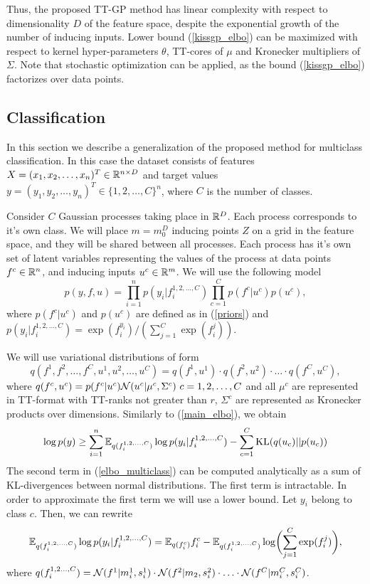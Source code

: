   Thus, the proposed TT-GP method has linear complexity with respect to dimensionality
  $D$ of the feature space, despite the exponential growth of the number of
  inducing inputs. Lower bound  (\ref{kissgp_elbo})
  can be maximized with respect to kernel hyper-parameters $\theta$, TT-cores
  of $\mu$ and Kronecker multipliers of $\Sigma$. Note that stochastic optimization
  can be applied, as the bound (\ref{kissgp_elbo}) factorizes over data points.

\subsection{Classification}

  In this section we describe a generalization of the proposed method for
  multiclass classification. In this case the dataset consists of features
  $X = (x_1, x_2, \ldots, x_n)^T \in \mathbb{R}^{n \times D}$ and target values
  $y = (y_1, y_2, \ldots, y_n)^T \in \{1, 2, \ldots, C\}^n$, where $C$ is the
  number of classes.

  Consider $C$ Gaussian processes taking place in $\mathbb{R}^D$. Each process
  corresponds to it's own class. We will place $m = m_0^D$ inducing points $Z$ on a grid
  in the feature space, and they will be shared between all processes. Each
  process has it's own set of latent variables representing the values of
  the process at data points $f^c \in \mathbb{R}^n$, and inducing inputs $u^c \in \mathbb{R}^m$.
  We will use the following model
  \[
    p(y, f, u) = \prod_{i=1}^n p(y_i | f_i^{1, 2, \ldots, C})
      \prod_{c=1}^C p(f^c | u^c) p(u^c),
  \]
  where $p(f^c | u^c)$ and $p(u^c)$ are defined as in (\ref{priors}) and $p(y_i | f_i^{1,2, \ldots, C}) = \exp(f_i^{y_i}) / (\sum_{j=1}^C\exp(f_i^j))$.
  
  We will use variational distributions of form
  \[
    q(f^1, f^2, \ldots, f^C, u^1, u^2, \ldots, u^C) =
    q(f^1, u^1) \cdot q(f^2, u^2) \cdot \ldots \cdot q(f^C, u^C),
  \]
  where $q(f^c, u^c) = p(f^c | u^c) \mathcal{N}(u^c | \mu^c, \Sigma^c)\ c=1, 2, \ldots, C$ and all $\mu^c$ are represented in TT-format with TT-ranks not greater than $r$,
  $\Sigma^c$ are represented as Kronecker products over dimensions. Similarly to (\ref{main_elbo}), we obtain
  \begin{equation}
  \label{elbo_multiclass}
    \log p(y) \ge \sum_{i = 1}^n \mathbb{E}_{q(f_i^{1, 2, \ldots, C})} \log p(y_i | f_i^{1, 2, \ldots, C})
      - \sum_{c = 1}^{C} \mbox{KL}(q(u_c) || p(u_c))
  \end{equation}
  The second term in (\ref{elbo_multiclass}) can be computed analytically as
  a sum of KL-divergences between normal distributions. The first term is
  intractable. In order to approximate the first term we will use a lower bound.
  Let $y_i$ belong to class $c$. Then, we can rewrite
  \begin{equation}
  \label{expectation_term}
    \mathbb{E}_{q(f_i^{1, 2, \ldots, C})} \log p(y_i | f_i^{1, 2, \ldots, C}) =
    \mathbb{E}_{q(f_i^c)} f_i^c - \mathbb{E}_{q(f_i^{1, 2, \ldots, C})}
    \log \biggl(\sum_{j=1}^C \exp (f_i^j) \biggr),
  \end{equation}
  where $q(f_i^{1, 2\ldots, C}) = \mathcal{N}(f^1 | m_i^1, s_i^1)\cdot \mathcal{N}(f^2| m_2, s_i^2) \cdot \ldots \cdot \mathcal{N}(f^C | m_i^C, s_i^C)$.

